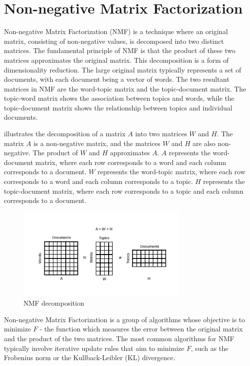 \section{Non-negative Matrix Factorization}
\label{sec:non-negative_matrix_factorization}
Non-negative Matrix Factorization (NMF) \cite{shahnaz_document_2006, kasiviswanathan_emerging_2011, yan_learning_2013} is a technique where an original matrix, consisting of non-negative values, is decomposed into two distinct matrices. The fundamental principle of NMF is that the product of these two matrices approximates the original matrix. This decomposition is a form of dimensionality reduction. The large original matrix typically represents a set of documents, with each document being a vector of words. The two resultant matrices in NMF are the word-topic matrix and the topic-document matrix. The topic-word matrix shows the association between topics and words, while the topic-document matrix shows the relationship between topics and individual documents.

 illustrates the decomposition of a matrix \(A\) into two matrices \(W\) and \(H\). The matrix \(A\) is a non-negative matrix, and the matrices \(W\) and \(H\) are also non-negative. The product of \(W\) and \(H\) approximates \(A\). \(A\) represents the word-document matrix, where each row corresponds to a word and each column corresponds to a document. \(W\) represents the word-topic matrix, where each row corresponds to a word and each column corresponds to a topic. \(H\) represents the topic-document matrix, where each row corresponds to a topic and each column corresponds to a document.

\begin{figure}[h] %
    \centering
    \includegraphics[width=0.75\textwidth]{figures/nmf.pdf}
    \caption{NMF decomposition}
    \label{fig:nmf}
\end{figure}

Non-negative Matrix Factorization is a group of algorithms whose objective is to minimize $F$ - the function which measures the error between the original matrix and the product of the two matrices. The most common algorithms for NMF typically involve iterative update rules that aim to minimize $F$, such as the Frobenius norm or the Kullback-Leibler (KL) divergence.

